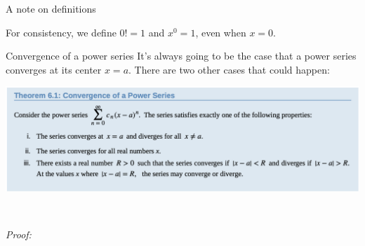 \documentclass[presentation]{beamer}
\begin{document}
\begin{frame}[label={sec:orgd660b0e}]{A note on definitions}
\begin{block}{}
For consistency, we define \(0! = 1\) and \(x^0 = 1\), even when
\(x=0\).
\end{block}
\end{frame}

\begin{frame}[label={sec:org68a6746}]{Convergence of a power series}
It's always going to be the case that a power series converges at its
center \(x = a\). There are two other cases that could happen:

\begin{center}
\begin{center}
\includegraphics[width=.9\linewidth]{../img/convPowSer.png}
\end{center}\\[0pt]
\end{center}

\emph{Proof:}
\end{frame}
\end{document}
